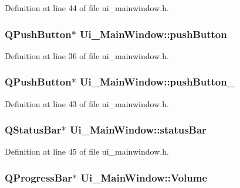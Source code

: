 Definition at line 44 of file ui\-\_\-mainwindow.\-h.

\hypertarget{class_ui___main_window_ad332d93084584930878f1daf5f84cdbf}{
\subsubsection[{push\-Button}]{\setlength{\rightskip}{0pt plus 5cm}Q\-Push\-Button$\ast$ Ui\-\_\-\-Main\-Window\-::push\-Button}}\label{class_ui___main_window_ad332d93084584930878f1daf5f84cdbf}


Definition at line 36 of file ui\-\_\-mainwindow.\-h.

\hypertarget{class_ui___main_window_a59a7d8124bce933d63f53f2153d447b4}{
\subsubsection[{push\-Button\-\_\-2}]{\setlength{\rightskip}{0pt plus 5cm}Q\-Push\-Button$\ast$ Ui\-\_\-\-Main\-Window\-::push\-Button\-\_}}\label{class_ui___main_window_a59a7d8124bce933d63f53f2153d447b4}


Definition at line 43 of file ui\-\_\-mainwindow.\-h.

\hypertarget{class_ui___main_window_a50fa481337604bcc8bf68de18ab16ecd}{
\subsubsection[{status\-Bar}]{\setlength{\rightskip}{0pt plus 5cm}Q\-Status\-Bar$\ast$ Ui\-\_\-\-Main\-Window\-::status\-Bar}}\label{class_ui___main_window_a50fa481337604bcc8bf68de18ab16ecd}


Definition at line 45 of file ui\-\_\-mainwindow.\-h.

\hypertarget{class_ui___main_window_aebd7f3ec198128c31e8cd5c8ec4bc853}{
\subsubsection[{Volume}]{\setlength{\rightskip}{0pt plus 5cm}Q\-Progress\-Bar$\ast$ Ui\-\_\-\-Main\-Window\-::\-Volume}}\label{class_ui___main_window_aebd7f3ec198128c31e8cd5c8ec4bc853}


